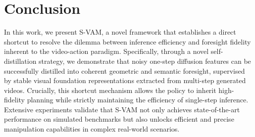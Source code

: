 \documentclass[runningheads]{llncs}
\begin{document}
\section{Conclusion}

\label{sec:conclusion}

In this work, we present S-VAM, a novel framework that establishes a direct shortcut to resolve the dilemma between inference efficiency and foresight fidelity inherent to the video-action paradigm. Specifically, through a novel self-distillation strategy, we demonstrate that noisy one-step diffusion features can be successfully distilled into coherent geometric and semantic foresight, supervised by stable visual foundation representations extracted from multi-step generated videos. Crucially, this shortcut mechanism allows the policy to inherit high-fidelity planning while strictly maintaining the efficiency of single-step inference. Extensive experiments validate that S-VAM not only achieves state-of-the-art performance on simulated benchmarks but also unlocks efficient and precise manipulation capabilities in complex real-world scenarios.


\clearpage 


\end{document}
